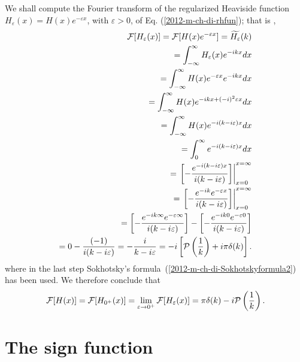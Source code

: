 {\color{OliveGreen}
\bproof
We shall compute the Fourier transform of the regularized Heaviside function
$H_\varepsilon (x) =H(x)e^{-\varepsilon x}$, with $\varepsilon >0$, of Eq. (\ref{2012-m-ch-di-rhfun}); that is  \cite{sommer-di},
\begin{equation}
\begin{split}
 {\cal F}[H_\varepsilon (x)] =
 {\cal F}[H(x)e^{-\varepsilon x}]
=\widetilde{H_\varepsilon }(k)
\\
=   \int_{-\infty}^\infty  H_\varepsilon (x) e^{-i{kx}} dx
\\
=   \int_{-\infty}^\infty  H(x)e^{-\varepsilon x}  e^{-i{kx}} dx
\\
=   \int_{-\infty}^\infty  H(x) e^{-i{kx}+(-i)^2\varepsilon x}  dx
\\
=   \int_{-\infty}^\infty  H(x) e^{-i(k - i \varepsilon ) x}  dx
\\
=   \int_{0}^\infty  e^{-i(k - i \varepsilon ) x}  dx
\\
=  \left. \left[ -\frac{ e^{-i(k - i \varepsilon ) x}}{i(k - i \varepsilon ) } \right] \right|_{x=0}^{x=\infty}
\\
=  \left. \left[ -\frac{ e^{-ik} e^{- \varepsilon   x}}{i(k - i \varepsilon ) } \right] \right|_{x=0}^{x=\infty}
\\
=  \left[ -\frac{ e^{-ik\infty} e^{- \varepsilon  \infty}}{i(k - i \varepsilon ) } \right]
-  \left[ -\frac{ e^{-ik0} e^{- \varepsilon  0}}{i(k - i \varepsilon ) } \right]
\\
=    0 - \frac{ (-1)}{i(k - i \varepsilon ) }
=     -\frac{ i}{k - i \varepsilon  }
= -i \left[ {\cal P} \left(\frac{1}{k}\right) + i \pi \delta (k)  \right]
.
\end{split}
\end{equation}
where in the last step Sokhotsky's  formula~(\ref{2012-m-ch-di-Sokhotskyformula2})
has been used.
We therefore conclude that
\begin{equation}
 {\cal F}[H(x)] =
 {\cal F}[H_{0^+} (x)] =
 \lim_{\varepsilon \rightarrow 0^+} {\cal F}[H_\varepsilon (x)] =
  \pi \delta (k)   -i {\cal P} \left(\frac{1}{k}\right)
.
\label{2012-m-ch-di-fthfu}
\end{equation}

\eproof
}




\section{The sign function}

